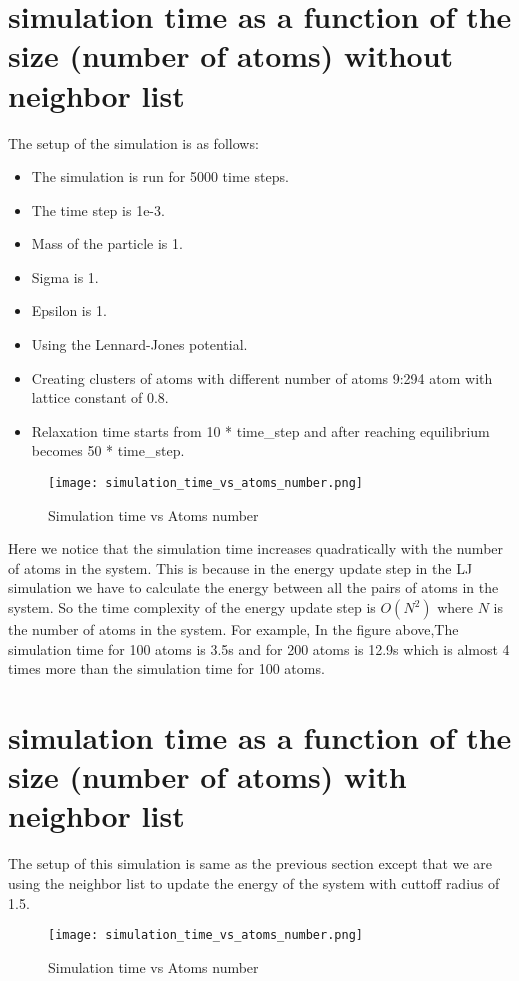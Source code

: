\section{simulation time as a function of the size (number of atoms) without neighbor list}
    The setup of the simulation is as follows:
    \begin{itemize}
        \item The simulation is run for 5000 time steps.
        \item The time step is 1e-3.
        \item Mass of the particle is 1.
        \item Sigma is 1.
        \item Epsilon is 1.
        \item Using the Lennard-Jones potential.
        \item Creating clusters of atoms with different number of atoms 9:294 atom with lattice constant of 0.8.
        \item Relaxation time starts from 10 * time\_step and after reaching equilibrium  becomes 50 * time\_step.
    \end{itemize}
    \graphicspath{ {./figures/milestone05/} }
    \begin{figure}[!htb]
    \centering
        \texttt{[image: simulation\_time\_vs\_atoms\_number.png]}
        \caption{Simulation time vs Atoms number}
    \label{fig:simulation_time_vs_atoms_number}
    \end{figure}
    Here we notice that the simulation time increases quadratically with the number of atoms in the system. This is because in the energy update step in the LJ simulation we have to calculate the energy between all the pairs of atoms in the system. So the time complexity of the energy update step is $O(N^2)$ where $N$ is the number of atoms in the system. For example, In the figure above,The  simulation time for 100 atoms is 3.5s and for 200 atoms is 12.9s which is almost 4 times more than the simulation time for 100 atoms.

\section{simulation time as a function of the size (number of atoms) with neighbor list}
    The setup of this simulation is same as the previous section except that we are using the neighbor list to update the energy of the system with cuttoff radius of 1.5.
    \graphicspath{ {./figures/milestone06/} }
    \begin{figure}[!htb]
    \centering
        \texttt{[image: simulation\_time\_vs\_atoms\_number.png]}
        \caption{Simulation time vs Atoms number}
    \label{fig:simulation_time_vs_atoms_number}
    \end{figure}  

